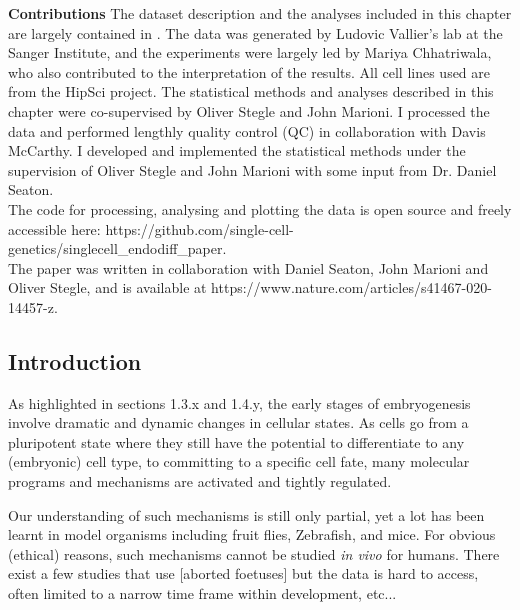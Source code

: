 \begin{Abstract}
\hspace{-3mm}\textbf{Contributions} The dataset description and the analyses included in this chapter are largely contained in \cite{cuomo2020single}. The data was generated by Ludovic Vallier’s lab at the Sanger Institute, and the experiments were largely led by Mariya Chhatriwala, who also contributed to the interpretation of the results. 
All cell lines used are from the HipSci project.
The statistical methods and analyses described in this chapter were co-supervised by Oliver Stegle and John Marioni. 
I processed the data and performed lengthly quality control (QC) in collaboration with Davis McCarthy. 
I developed and implemented the statistical methods under the supervision of Oliver Stegle and John Marioni with some input from Dr. Daniel  Seaton.\\

The code for processing, analysing and plotting the data is open source and freely accessible here: https://github.com/single-cell-genetics/singlecell\_endodiff\_paper.\\ 

The paper was written in collaboration with Daniel Seaton, John Marioni and Oliver Stegle, and is available at https://www.nature.com/articles/s41467-020-14457-z.
\vfill
\end{Abstract}

\subsection{Introduction}

As highlighted in sections 1.3.x and 1.4.y, the early stages of embryogenesis involve dramatic and dynamic changes in cellular states. 
As cells go from a pluripotent state where they still have the potential to differentiate to any (embryonic) cell type, to committing to a specific cell fate, many molecular programs and mechanisms are activated and tightly regulated.

Our understanding of such mechanisms is still only partial, yet a lot has been learnt in model organisms including fruit flies, Zebrafish, and mice. 
For obvious (ethical) reasons, such mechanisms cannot be studied \textit{in vivo} for humans. There exist a few studies that use [aborted foetuses] but the data is hard to access, often limited to a narrow time frame within development, etc...

